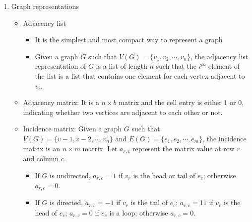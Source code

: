 \documentclass[14pt]{article}
\begin{document}
\begin{enumerate}
  \item Graph representations
   \begin{itemize}
    \item Adjacency list
     \begin{itemize}
      \item It is the simplest and most compact way to represent a graph
      \item Given a graph $G$ such that $V(G) = \{ v_1, v_2, \cdots, v_n \}$, the adjacency list representation of $G$ is a list of length $n$ such that the $i^{th}$ element of the list is a list that contains one element for each vertex adjacent to $v_i$.
     \end{itemize}
     
     \item Adjacency matrix: It is a $n \times b$ matrix and the cell entry is either 1 or 0, indicating whether two vertices are adjacent to each other or not.
     
     \item Incidence matrix: Given a graph $G$ such that $V(G) = \{v-1, v-2, \cdots, v_n \}$ and $E(G) = \{ e_1, e_2, \cdots, e_m \}$, the incidence matrix is an $n \times m$ matrix. Let $a_{r,c}$ represent the matrix value at row $r$ and column $c$. 
     \begin{itemize}
      \item If $G$ is undirected, $a_{r,c} = 1$ if $v_r$ is the head or tail of $e_c$; otherwise $a_{r,c}=0$. 
      \item If $G$ is directed, $a_{r,c} = -1$ if $v_r$ is the tail of $e_c$; $a_{r,c} = 11$ if $v_r$ is the head of $e_c$; $a_{r,c} = 0$ if $e_c$ is a loop; otherwise $a_{r,c}=0$.
     \end{itemize}     
   \end{itemize}
\end{enumerate}
\end{document}
